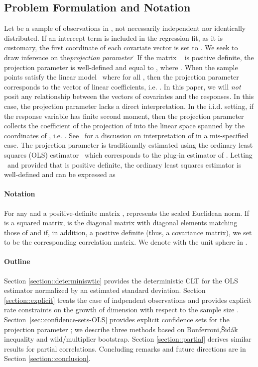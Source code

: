 \documentclass{article}
\begin{document}
\subsection*{Problem Formulation and Notation}
Let   be a sample of   observations in  , not necessarily independent nor identically distributed. If an intercept term is included in the regression fit, as it is customary, the first coordinate of each covariate vector   is set to  .
We seek to draw inference on the{\it projection parameter}
\.
\]
If the matrix
\ \]
is positive definite, the projection parameter
is well-defined and equal to  , where  .
When the sample points satisfy the linear model
\ where   for all  , then the projection parameter corresponds to the vector of linear coefficients, i.e.  . In this paper, we will \emph{not} posit any relationship between the vectors of covariates   and the responses. In this case, the projection parameter lacks a direct interpretation. In the i.i.d. setting, if the response variable has finite second moment, then the projection parameter collects the coefficient of the   projection of   into the linear space spanned by the coordinates of  , i.e.  . See~\cite{Buja14,Buja16} for a discussion on interpretation of   in a mis-specified case.
The projection parameter is traditionally estimated using the ordinary least squares (OLS) estimator
\ which corresponds to the plug-in estimator of  .
Letting
\ and provided that   is positive definite, the ordinary least squares estimator is well-defined and can be expressed as
\ \paragraph{Notation} For any   and a positive-definite matrix  ,   represents the scaled Euclidean norm. If   is a squared matrix,   is the diagonal matrix with diagonal elements matching those of   and if, in addition,   a positive definite (thus, a covariance matrix), we set   to be the corresponding correlation matrix.
We denote with   the unit sphere in  .
\paragraph{Outline}
Section \ref{section::determiniswtic}
provides the deterministic CLT for
the OLS estimator normalized by an estimated
standard deviation.
Section \ref{section::explicit}
treats the case of indpendent observations
and provides explicit rate constraints on
the growth of dimension   with respect to
the sample size  .
Section~\ref{sec::confidence-sets-OLS} provides
explicit confidence sets for the projection
parameter  ; we describe three methods
based on Bonferroni,{\v{S}}id{\'a}k inequality
and wild/multiplier bootstrap.
Section \ref{section::partial}
derives similar results for partial correlations.
Concluding remarks and future directions are in
Section \ref{section::conclusion}.
\end{document}
